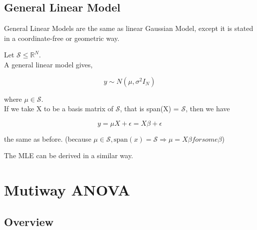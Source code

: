 \documentclass[11pt,fleqn]{book} %
\begin{document}
 \section{General Linear Model}

\begin{definition}
	General Linear Models are the same as linear Gaussian Model, except it is stated in a coordinate-free or geometric way. 
\end{definition}

Let $\mathcal{S} \leq \mathbb{R}^N$.\\

A general linear model gives,

$$y \sim N(\mu, \sigma^2 I_N) $$

where $\mu \in \mathcal{S}$. \\

If we take X to be a basis matrix of $\mathcal{S}$, that is span(X) = $\mathcal{S}$, then we have 

$$y = \mu X + \epsilon = X\beta + \epsilon $$

the same as before. (because $\mu \in \mathcal{S}, \text{span}(x) = \mathcal{S} \Rightarrow \mu = X\beta for some \beta$)

The MLE can be derived in a similar way.  
















\chapter{Mutiway ANOVA}

\section{Overview}
\end{document}
